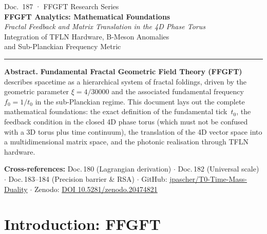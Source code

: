 
\thispagestyle{firstpage}
\begin{center}
  {\small\color{T0gray} Doc.~187 · FFGFT Research Series}\\[6pt]
  {\LARGE\bfseries\color{T0blue}
    FFGFT Analytics: Mathematical Foundations}\\[6pt]
  {\large\itshape\color{T0gray}
    Fractal Feedback and Matrix Translation in the 4D Phase Torus}\\[4pt]
  {\normalsize\color{T0gray}
    Integration of TFLN Hardware, B-Meson Anomalies\\
    and Sub-Planckian Frequency Metric}\\[8pt]
  {\color{T0red}\rule{0.65\linewidth}{1.5pt}}
\end{center}
\vspace{4pt}

\begin{infobox}
\textbf{Abstract.}
\textbf{Fundamental Fractal Geometric Field Theory (FFGFT)} describes
spacetime as a hierarchical system of fractal foldings, driven by the
geometric parameter $\xi = 4/30000$ and the associated fundamental
frequency~$f_0 = 1/t_0$ in the sub-Planckian regime.
This document lays out the complete mathematical foundations:
the exact definition of the fundamental tick~$t_0$, the feedback condition
in the closed 4D phase torus (which must not be confused with a 3D torus
plus time continuum), the translation of the 4D vector space into a
multidimensional matrix space, and the photonic realisation through
TFLN hardware.

\smallskip\noindent\textbf{Cross-references:}
Doc.\,180 (Lagrangian derivation) $\cdot$
Doc.\,182 (Universal scale) $\cdot$
Doc.\,183--184 (Precision barrier \& RSA) $\cdot$
GitHub: \href{https://github.com/jpascher/T0-Time-Mass-Duality}{jpascher/T0-Time-Mass-Duality} $\cdot$
Zenodo: \href{https://zenodo.org/records/20474821}{DOI 10.5281/zenodo.20474821}
\end{infobox}

\tableofcontents
\bigskip

\section{Introduction: FFGFT}

